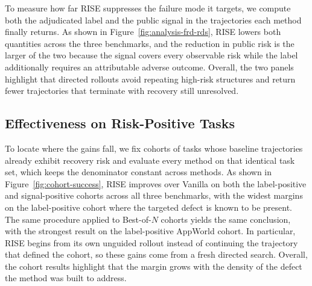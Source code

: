 \documentclass{article}
\newcommand{\method}{RISE\xspace}
\begin{document}
To measure how far \method suppresses the failure mode it targets, we compute both the adjudicated label and the public signal in the trajectories each method finally returns. As shown in Figure~\ref{fig:analysis-frd-rds}, \method lowers both quantities across the three benchmarks, and the reduction in public risk is the larger of the two because the signal covers every observable risk while the label additionally requires an attributable adverse outcome. Overall, the two panels highlight that directed rollouts avoid repeating high-risk structures and return fewer trajectories that terminate with recovery still unresolved.

\subsection{Effectiveness on Risk-Positive Tasks}
To locate where the gains fall, we fix cohorts of tasks whose baseline trajectories already exhibit recovery risk and evaluate every method on that identical task set, which keeps the denominator constant across methods. As shown in Figure~\ref{fig:cohort-success}, \method improves over Vanilla on both the label-positive and signal-positive cohorts across all three benchmarks, with the widest margins on the label-positive cohort where the targeted defect is known to be present. The same procedure applied to \mbox{Best-of-$N$} cohorts yields the same conclusion, with the strongest result on the label-positive AppWorld cohort. In particular, \method begins from its own unguided rollout instead of continuing the trajectory that defined the cohort, so these gains come from a fresh directed search. Overall, the cohort results highlight that the margin grows with the density of the defect the method was built to address.
\end{document}
